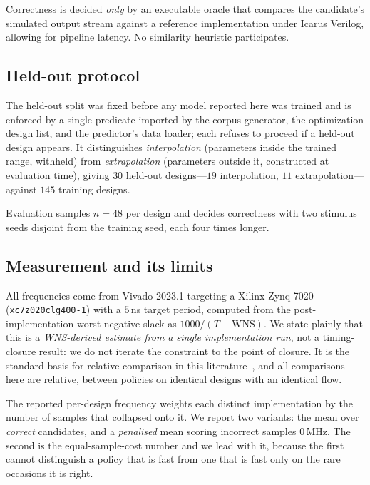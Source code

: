 \documentclass[journal]{IEEEtran}
\begin{document}
Correctness is decided \emph{only} by an executable oracle that compares the
candidate's simulated output stream against a reference implementation under
Icarus Verilog, allowing for pipeline latency. No similarity heuristic
participates.

\subsection{Held-out protocol}

The held-out split was fixed before any model reported here was trained and is
enforced by a single predicate imported by the corpus generator, the
optimization design list, and the predictor's data loader; each refuses to
proceed if a held-out design appears. It distinguishes \emph{interpolation}
(parameters inside the trained range, withheld) from \emph{extrapolation}
(parameters outside it, constructed at evaluation time), giving $30$ held-out
designs---$19$ interpolation, $11$ extrapolation---against $145$ training
designs.

Evaluation samples $n=48$ per design and decides correctness with two stimulus
seeds disjoint from the training seed, each four times longer.

\subsection{Measurement and its limits}

All frequencies come from Vivado 2023.1 targeting a Xilinx Zynq-7020
(\texttt{xc7z020clg400-1}) with a $5$\,ns target period, computed from the
post-implementation worst negative slack as $1000/(T - \mathrm{WNS})$. We state
plainly that this is a \emph{WNS-derived estimate from a single implementation
run}, not a timing-closure result: we do not iterate the constraint to the point
of closure. It is the standard basis for relative comparison in this
literature~\cite{ustun2020accurate}, and all comparisons here are relative,
between policies on identical designs with an identical flow.

The reported per-design frequency weights each distinct implementation by the
number of samples that collapsed onto it. We report two variants: the mean over
\emph{correct} candidates, and a \emph{penalised} mean scoring incorrect samples
$0$\,MHz. The second is the equal-sample-cost number and we lead with it,
because the first cannot distinguish a policy that is fast from one that is fast
only on the rare occasions it is right.
\end{document}

